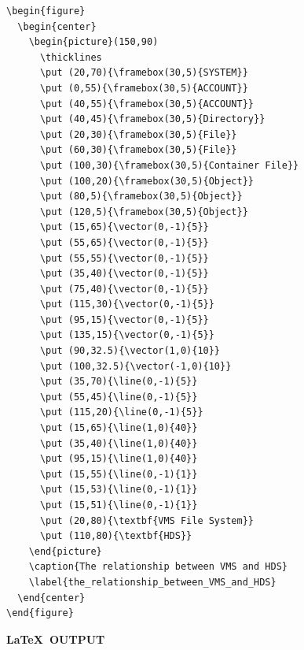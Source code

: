 \documentclass[twoside,11pt]{article}
\begin{document}
\begin{verbatim}
\begin{figure}
  \begin{center}
    \begin{picture}(150,90)
      \thicklines
      \put (20,70){\framebox(30,5){SYSTEM}}
      \put (0,55){\framebox(30,5){ACCOUNT}}
      \put (40,55){\framebox(30,5){ACCOUNT}}
      \put (40,45){\framebox(30,5){Directory}}
      \put (20,30){\framebox(30,5){File}}
      \put (60,30){\framebox(30,5){File}}
      \put (100,30){\framebox(30,5){Container File}}
      \put (100,20){\framebox(30,5){Object}}
      \put (80,5){\framebox(30,5){Object}}
      \put (120,5){\framebox(30,5){Object}}
      \put (15,65){\vector(0,-1){5}}
      \put (55,65){\vector(0,-1){5}}
      \put (55,55){\vector(0,-1){5}}
      \put (35,40){\vector(0,-1){5}}
      \put (75,40){\vector(0,-1){5}}
      \put (115,30){\vector(0,-1){5}}
      \put (95,15){\vector(0,-1){5}}
      \put (135,15){\vector(0,-1){5}}
      \put (90,32.5){\vector(1,0){10}}
      \put (100,32.5){\vector(-1,0){10}}
      \put (35,70){\line(0,-1){5}}
      \put (55,45){\line(0,-1){5}}
      \put (115,20){\line(0,-1){5}}
      \put (15,65){\line(1,0){40}}
      \put (35,40){\line(1,0){40}}
      \put (95,15){\line(1,0){40}}
      \put (15,55){\line(0,-1){1}}
      \put (15,53){\line(0,-1){1}}
      \put (15,51){\line(0,-1){1}}
      \put (20,80){\textbf{VMS File System}}
      \put (110,80){\textbf{HDS}}
    \end{picture}
    \caption{The relationship between VMS and HDS}
    \label{the_relationship_between_VMS_and_HDS}
  \end{center}
\end{figure}
\end{verbatim}

\newpage

\begin{center}
  \textbf{\LaTeX\ OUTPUT}
\end{center}
\end{document}
